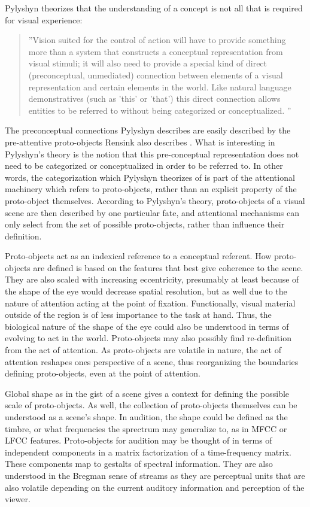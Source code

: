 Pylyshyn theorizes that the understanding of a concept is not all that is required for visual experience: 
\begin{quotation}
''Vision suited for the control of action will have to provide something more than a system that constructs a conceptual representation from visual stimuli; it will also need to provide a special kind of direct (preconceptual, unmediated) connection between elements of a visual representation and certain elements in the world. Like natural language demonstratives (such as 'this' or 'that') this direct connection allows entities to be referred to without being categorized or conceptualized. \cite{Pylyshyn2001}''
\end{quotation}  
The preconceptual connections Pylyshyn describes are easily described by the pre-attentive proto-objects Rensink also describes \cite{Rensink2000,Rensink2001}.  What is interesting in Pylyshyn's theory is the notion that this pre-conceptual representation does not need to be categorized or conceptualized in order to be referred to.  In other words, the categorization which Pylyshyn theorizes of is part of the attentional machinery which refers to proto-objects, rather than an explicit property of the proto-object themselves.  According to Pylyshyn's theory, proto-objects of a visual scene are then described by one particular fate, and attentional mechanisms can only select from the set of possible proto-objects, rather than influence their definition. 

Proto-objects act as an indexical reference to a conceptual referent.  How proto-objects are defined is based on the features that best give coherence to the scene.  They are also scaled with increasing eccentricity, presumably at least because of the shape of the eye would decrease spatial resolution, but as well due to the nature of attention acting at the point of fixation.  Functionally, visual material outside of the region is of less importance to the task at hand.  Thus, the biological nature of the shape of the eye could also be understood in terms of evolving to act in the world.  Proto-objects may also possibly find re-definition from the act of attention.  As proto-objects are volatile in nature, the act of attention reshapes ones perspective of a scene, thus reorganizing the boundaries defining proto-objects, even at the point of attention.

Global shape as in the gist of a scene gives a context for defining the possible scale of proto-objects.  As well, the collection of proto-objects themselves can be understood as a scene's shape.  In audition, the shape could be defined as the timbre, or what frequencies the sprectrum may generalize to, as in MFCC or LFCC features.  Proto-objects for audition may be thought of in terms of independent components in a matrix factorization of a time-frequency matrix.  These components map to gestalts of spectral information.  They are also understood in the Bregman sense of streams as they are perceptual units that are also volatile depending on the current auditory information and perception of the viewer.

